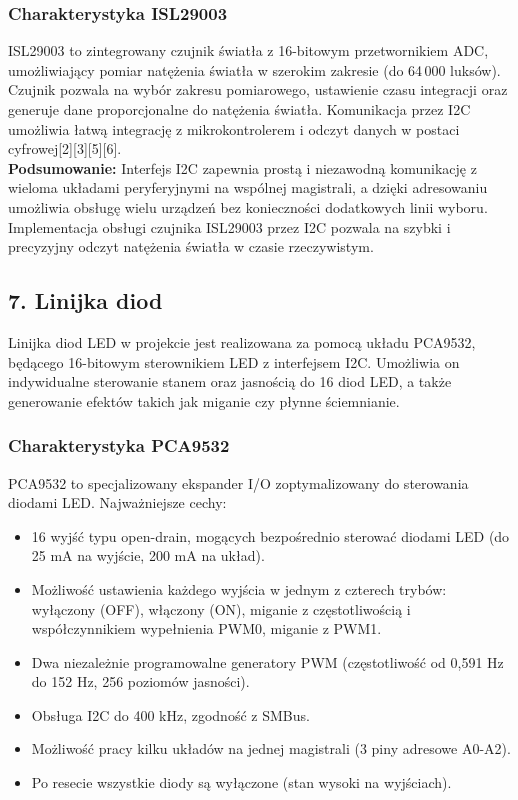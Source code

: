 \documentclass[a4paper,12pt]{report}
\begin{document}
\subsubsection*{Charakterystyka ISL29003}

ISL29003 to zintegrowany czujnik światła z 16-bitowym przetwornikiem ADC, umożliwiający pomiar natężenia światła w szerokim zakresie (do 64\,000 luksów). Czujnik pozwala na wybór zakresu pomiarowego, ustawienie czasu integracji oraz generuje dane proporcjonalne do natężenia światła. Komunikacja przez I2C umożliwia łatwą integrację z mikrokontrolerem i odczyt danych w postaci cyfrowej[2][3][5][6].\\

\textbf{Podsumowanie:}  
Interfejs I2C zapewnia prostą i niezawodną komunikację z wieloma układami peryferyjnymi na wspólnej magistrali, a dzięki adresowaniu umożliwia obsługę wielu urządzeń bez konieczności dodatkowych linii wyboru. Implementacja obsługi czujnika ISL29003 przez I2C pozwala na szybki i precyzyjny odczyt natężenia światła w czasie rzeczywistym.

\subsection*{7. Linijka diod}

Linijka diod LED w projekcie jest realizowana za pomocą układu PCA9532, będącego 16-bitowym sterownikiem LED z interfejsem I2C. Umożliwia on indywidualne sterowanie stanem oraz jasnością do 16 diod LED, a także generowanie efektów takich jak miganie czy płynne ściemnianie.

\subsubsection*{Charakterystyka PCA9532}

PCA9532 to specjalizowany ekspander I/O zoptymalizowany do sterowania diodami LED. Najważniejsze cechy:
\begin{itemize}
    \item 16 wyjść typu open-drain, mogących bezpośrednio sterować diodami LED (do 25 mA na wyjście, 200 mA na układ).
    \item Możliwość ustawienia każdego wyjścia w jednym z czterech trybów: wyłączony (OFF), włączony (ON), miganie z częstotliwością i współczynnikiem wypełnienia PWM0, miganie z PWM1.
    \item Dwa niezależnie programowalne generatory PWM (częstotliwość od 0,591 Hz do 152 Hz, 256 poziomów jasności).
    \item Obsługa I2C do 400 kHz, zgodność z SMBus.
    \item Możliwość pracy kilku układów na jednej magistrali (3 piny adresowe A0-A2).
    \item Po resecie wszystkie diody są wyłączone (stan wysoki na wyjściach).
\end{itemize}
\end{document}
